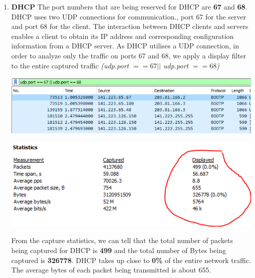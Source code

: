 \documentclass[a4paper,11pt]{article}
\begin{document}
\begin{enumerate}
	\item \textbf{DHCP}
	\newline
	The port numbers that are being reserved for DHCP are \textbf{67} and \textbf{68}. DHCP uses two UDP connections for communication., port 67 for the server and port 68 for the client. The interaction between DHCP clients and servers enables a client to obtain its IP address and corresponding configuration information from a DHCP server. As DHCP utilises a UDP connection, in order to analyze only the traffic on ports 67 and 68, we apply a display filter to the entire captured traffic \textit{(udp.port $== 67 || $ udp.port $== 68$)}\newline
	\begin{minipage}{3in}
	\centering
		\includegraphics[width = 16cm]{udpfilter}
		\captionsetup{justification=centering}
	\end{minipage}
	\newline\newline
	\begin{minipage}{5in}
	\centering
		\includegraphics[width = 16cm]{dhcpstatistics}
		\captionsetup{justification=centering}
	\end{minipage}
\newline\newline
	From the capture statistics, we can tell that the total number of packets being captured for DHCP is \textbf{499} and the total number of Bytes being captured is \textbf{326778}. DHCP takes up close to \textbf{0\%} of the entire network traffic. The average bytes of each packet being transmitted is about 655. 

\end{enumerate}
\end{document}
